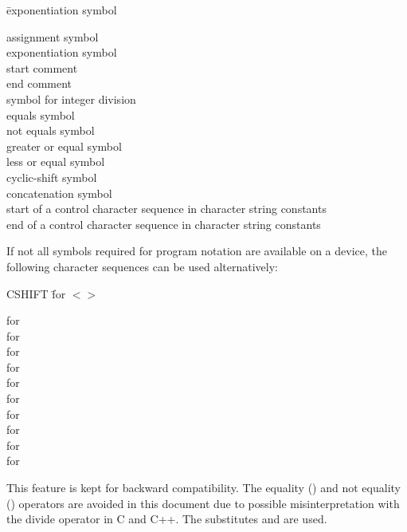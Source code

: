 \begin{tabbing}
\x \= exponentiation symbol \kill

\code{:=}    \> assignment symbol\\ \relax
\code{**}    \> exponentiation symbol\\
\code{/*}    \> start comment\\ \relax
\code{*/}    \> end comment\\
\code{//}    \> symbol for integer division\\
\code{==}    \> equals symbol\\
\code{/=}    \> not equals symbol\\
\code{<=}  \> greater or equal symbol\\
\code{>=}  \> less or equal symbol\\
\code{<>}  \> cyclic-shift symbol\\
\code{><}  \> concatenation symbol\\
 \> start of a control character sequence in character string constants\\
 \> end of a control character sequence in character string constants
\end{tabbing}

If not all symbols required for program notation are available on a
device, the following character sequences can be used alternatively:

\begin{tabbing}
CSHIFT \= for $<>$ \kill

    \> for \code{$<$}\\
     \> for \code{$>$}\\
     \> for \code{==}\\
     \> for \code{/=}\\
     \> for \code{<=}\\
     \> for \code{>=}\\
 \> for \code{<>}\\
    \> for \code{><}\\
\code{(/}     \> for \code{[}\\
\code{/)}     \> for \code{]}\\
\end{tabbing}
This feature is kept for backward compatibility.
The equality (\code{==}) and not equality (\code{/=}) operators are avoided
in this document due to possible misinterpretation 
with the divide operator in C and C++. The substitutes  and  are 
used.

